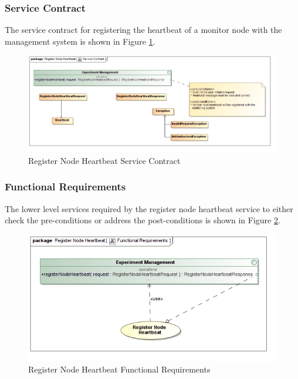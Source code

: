 \subsubsection{Service Contract}
The service contract for registering the heartbeat of a monitor node with the
management system is shown in Figure \ref{fig:registerNodeHeartbeatServiceContract}.
\begin{figure}[H]
  \begin{center}
  \includegraphics[scale=0.38]{../Diagrams and Charts/Experiment/Register Node Heartbeat Service Contract.jpg}
  \caption{Register Node Heartbeat Service Contract}
  \label{fig:registerNodeHeartbeatServiceContract}
  \end{center}
\end{figure}

\subsubsection {Functional Requirements}
The lower level services required by the register node heartbeat service to 
either check the pre-conditions or address the post-conditions is shown in
Figure \ref{fig:registerNodeHeartbeatFunctionalRequirements}.
\begin{figure}[H]
  \begin{center}
  \includegraphics[scale=0.38]{../Diagrams and Charts/Experiment/Register Node Heartbeat Functional Requirements.jpg}
  \caption{Register Node Heartbeat Functional Requirements}
  \label{fig:registerNodeHeartbeatFunctionalRequirements}
  \end{center}
\end{figure}



